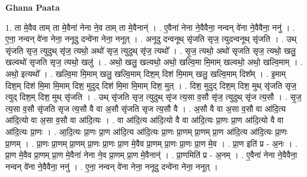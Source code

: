 \documentclass[17pt]{extarticle}
\begin{document}
\textbf{Ghana Paata } \newline

1. ता मे॒वैव ताम् ता मे॒वैना॑ नेना ने॒व ताम् ता मे॒वैनान्॑ । . ए॒वैना॑ नेना ने॒वैवैना॒ नन्वन् वे॑ना ने॒वैवैना॒ ननु॑ । . ए॒ना॒ नन्वन् वे॑ना नेना॒ ननूदु दन्वे॑ना नेना॒ ननूत् । . अनूदु दन्वनूथ् सृ॑जति सृज॒ त्युदन्वनूथ् सृ॑जति । . उथ् सृ॑जति सृज॒ त्युदुथ् सृ॑ज॒ त्यथो॒ अथो॑ सृज॒ त्युदुथ् सृ॑ज॒ त्यथो᳚ । . सृ॒ज॒ त्यथो॒ अथो॑ सृजति सृज॒ त्यथो॒ खलु॒ खल्वथो॑ सृजति सृज॒ त्यथो॒ खलु॑ । . अथो॒ खलु॒ खल्वथो॒ अथो॒ खल्वि॒मा मि॒माम् खल्वथो॒ अथो॒ खल्वि॒माम् । . अथो॒ इत्यथो᳚ । . खल्वि॒मा मि॒माम् खलु॒ खल्वि॒माम् दिश॒म् दिश॑ मि॒माम् खलु॒ खल्वि॒माम् दिश᳚म् । . इ॒माम् दिश॒म् दिश॑ मि॒मा मि॒माम् दिश॒ मुदुद् दिश॑ मि॒मा मि॒माम् दिश॒ मुत् । . दिश॒ मुदुद् दिश॒म् दिश॒ मुथ् सृ॑जति सृज॒ त्युद् दिश॒म् दिश॒ मुथ् सृ॑जति । . उथ् सृ॑जति सृज॒ त्युदुथ् सृ॑ज त्य॒सा व॒सौ सृ॑ज॒ त्युदुथ् सृ॑ज त्य॒सौ । . सृ॒ज॒ त्य॒सा व॒सौ सृ॑जति सृज त्य॒सौ वै वा अ॒सौ सृ॑जति सृज त्य॒सौ वै । . अ॒सौ वै वा अ॒सा व॒सौ वा आ॑दि॒त्य आ॑दि॒त्यो वा अ॒सा व॒सौ वा आ॑दि॒त्यः । . वा आ॑दि॒त्य आ॑दि॒त्यो वै वा आ॑दि॒त्यः प्रा॒णः प्रा॒ण आ॑दि॒त्यो वै वा आ॑दि॒त्यः प्रा॒णः । . आ॒दि॒त्यः प्रा॒णः प्रा॒ण आ॑दि॒त्य आ॑दि॒त्यः प्रा॒णः प्रा॒णम् प्रा॒णम् प्रा॒ण आ॑दि॒त्य आ॑दि॒त्यः प्रा॒णः प्रा॒णम् । . प्रा॒णः प्रा॒णम् प्रा॒णम् प्रा॒णः प्रा॒णः प्रा॒ण मे॒वैव प्रा॒णम् प्रा॒णः प्रा॒णः प्रा॒ण मे॒व । . प्रा॒ण इति॑ प्र - अ॒नः । . प्रा॒ण मे॒वैव प्रा॒णम् प्रा॒ण मे॒वैना॑ नेना ने॒व प्रा॒णम् प्रा॒ण मे॒वैनान्॑ । . प्रा॒णमिति॑ प्र - अ॒नम् । . ए॒वैना॑ नेना ने॒वैवैना॒ नन्वन् वे॑ना ने॒वैवैना॒ ननु॑ । . ए॒ना॒ नन्वन् वे॑ना नेना॒ ननूदु दन्वे॑ना नेना॒ ननूत् । \newline
\end{document}
